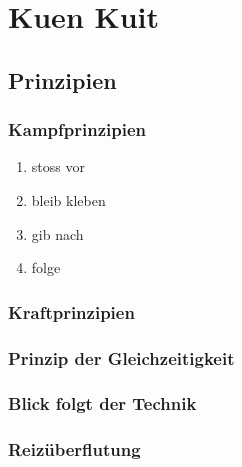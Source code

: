 
\renewcommand\chapterillustration{six-computers-chips-circuits}
\chapter{Kuen Kuit}



\section{Prinzipien}


\subsection{Kampfprinzipien}

\begin{enumerate}
	\item stoss vor
	\item bleib kleben
	\item gib nach
	\item folge
\end{enumerate}

\subsection{Kraftprinzipien}

\subsection{Prinzip der Gleichzeitigkeit}

\subsection{Blick folgt der Technik}


\subsection{Reiz\"uberflutung}


